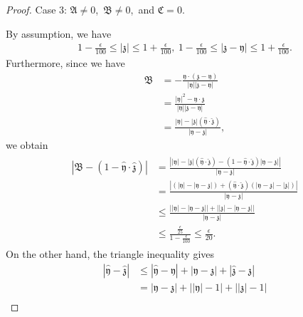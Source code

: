 \documentclass[reqno]{amsart}
\theoremstyle{plain}
\theoremstyle{definition}
\numberwithin{equation}{section}
\begin{document}
\begin{proof}
Case 3: $\mathfrak{A}\neq 0$,\ $\mathfrak{B}\neq 0$,\ and $\mathfrak{C}=0$.

By assumption, we have
\begin{align}\label{Case3assu}
1-\frac{\epsilon}{100}\leq |\mathfrak{z}|\leq 1+\frac{\epsilon}{100},\ 1-\frac{\epsilon}{100}\leq |\mathfrak{z}-\mathfrak{y}|\leq 1+\frac{\epsilon}{100}.
\end{align}
Furthermore, since we have
\begin{align*}
\mathfrak{B}
&=
-\frac{\mathfrak{y}\cdot(\mathfrak{z}-\mathfrak{y})}
{|\mathfrak{y}||\mathfrak{z}-\mathfrak{y}|}
\\
&=
\frac{|\mathfrak{y}|^2-\mathfrak{y}\cdot\mathfrak{z}}
{|\mathfrak{y}||\mathfrak{z}-\mathfrak{y}|}
\\
&=
\frac{|\mathfrak{y}|
-|\mathfrak{z}|
\left(\hat{\mathfrak{y}}\cdot\hat{\mathfrak{z}}\right)}
{|\mathfrak{y}-\mathfrak{z}|},
\end{align*}
we obtain
\begin{align}\label{Case3es1}
\begin{aligned}
\left|
\mathfrak{B}
-\left(1-\hat{\mathfrak{y}}\cdot\hat{\mathfrak{z}}\right)
\right|
&=
\frac{
\left|
|\mathfrak{y}|
-|\mathfrak{z}|
\left(\hat{\mathfrak{y}}\cdot\hat{\mathfrak{z}}\right)
-\left(1-\hat{\mathfrak{y}}\cdot\hat{\mathfrak{z}}\right)
|\mathfrak{y}-\mathfrak{z}|
\right|
}
{|\mathfrak{y}-\mathfrak{z}|}
\\
&=
\frac{
\left|
\left(|\mathfrak{y}|-|\mathfrak{y}-\mathfrak{z}|\right)
+
\left(\hat{\mathfrak{y}}\cdot\hat{\mathfrak{z}}\right)
\left(|\mathfrak{y}-\mathfrak{z}|-|\mathfrak{z}|\right)
\right|
}
{|\mathfrak{y}-\mathfrak{z}|}
\\
&\leq
\frac{
\left||\mathfrak{y}|-|\mathfrak{y}-\mathfrak{z}|\right|
+
\left||\mathfrak{z}|-|\mathfrak{y}-\mathfrak{z}|\right|
}
{|\mathfrak{y}-\mathfrak{z}|}
\\
&\leq
\frac{\frac{\epsilon}{25}}
{1-\frac{\epsilon}{100}}
\leq
\frac{\epsilon}{20}.
\end{aligned}
\end{align}
On the other hand, the triangle inequality gives
\begin{align*}
\left|\hat{\mathfrak{y}}-\hat{\mathfrak{z}}\right|
&\leq
\left|\hat{\mathfrak{y}}-\mathfrak{y}\right|
+
\left|\mathfrak{y}-\mathfrak{z}\right|
+
\left|\hat{\mathfrak{z}}-\mathfrak{z}\right|
\\
&=
|\mathfrak{y}-\mathfrak{z}|
+
\left||\mathfrak{y}|-1\right|
+
\left||\mathfrak{z}|-1\right|
\\

\end{align*}
\end{proof}
\end{document}
